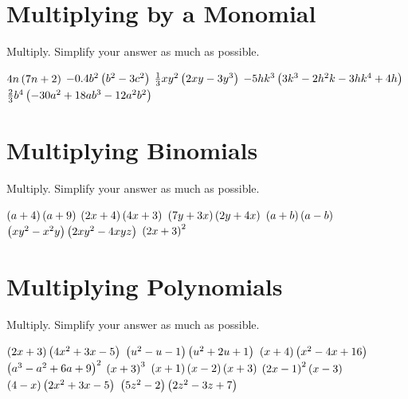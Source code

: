 \section*{Multiplying by a Monomial}
Multiply.  Simplify your answer as much as possible.
\begin{smenum}
\mitemxxx
{$4n\left(7n+2\right)$}
{$-0.4b^2\left(b^2-3c^2\right)$}
{$\frac{1}{3}xy^2\left(2xy-3y^3\right)$}
\mitemxx
{$-5hk^3\left(3k^3-2h^2k-3hk^4+4h\right)$}
{$\frac{2}{3}b^4\left(-30a^2+18ab^3-12a^2b^2\right)$}
\end{smenum}

\section*{Multiplying Binomials}
Multiply. Simplify your answer as much as possible.
\begin{smenum}
\mitemxxx
{$\left(a+4\right)\left(a+9\right)$}
{$\left(2x+4\right)\left(4x+3\right)$}
{$\left(7y+3x\right)\left(2y+4x\right)$}
\mitemxxx
{$\left(a+b\right)\left(a-b\right)$}
{$\left(xy^2-x^2y\right)\left(2xy^2-4xyz\right)$}
{$\left(2x+3\right)^2$}
\end{smenum}

\section*{Multiplying Polynomials}
Multiply. Simplify your answer as much as possible.
\begin{smenum}
\mitemxxx
{$\left(2x+3\right)\left(4x^2+3x-5\right)$}
{$\left(u^2-u-1\right)\left(u^2+2u+1\right)$}
{$\left(x+4\right)\left(x^2-4x+16\right)$}
\mitemxxx
{$\left(a^3-a^2+6a+9\right)^2$}
{$\left(x+3\right)^3$}
{$\left(x+1\right)\left(x-2\right)\left(x+3\right)$}
\mitemxxx
{$\left(2x-1\right)^2\left(x-3\right)$}
{$\left(4-x\right)\left(2x^2+3x-5\right)$}
{$\left(5z^2-2\right)\left(2z^2-3z+7\right)$}
\end{smenum}


